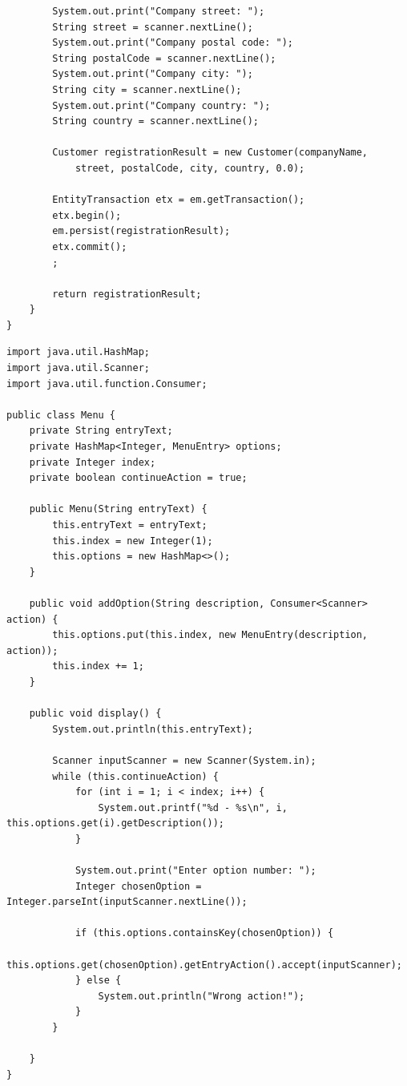 \documentclass[12pt, a4paper]{mwart}
\begin{document}
\begin{lstlisting}
        System.out.print("Company street: ");
        String street = scanner.nextLine();
        System.out.print("Company postal code: ");
        String postalCode = scanner.nextLine();
        System.out.print("Company city: ");
        String city = scanner.nextLine();
        System.out.print("Company country: ");
        String country = scanner.nextLine();

        Customer registrationResult = new Customer(companyName, 
        	street, postalCode, city, country, 0.0);

        EntityTransaction etx = em.getTransaction();
        etx.begin();
        em.persist(registrationResult);
        etx.commit();
        ;

        return registrationResult;
    }
}
\end{lstlisting}

\begin{lstlisting}
import java.util.HashMap;
import java.util.Scanner;
import java.util.function.Consumer;

public class Menu {
    private String entryText;
    private HashMap<Integer, MenuEntry> options;
    private Integer index;
    private boolean continueAction = true;

    public Menu(String entryText) {
        this.entryText = entryText;
        this.index = new Integer(1);
        this.options = new HashMap<>();
    }

    public void addOption(String description, Consumer<Scanner> action) {
        this.options.put(this.index, new MenuEntry(description, action));
        this.index += 1;
    }

    public void display() {
        System.out.println(this.entryText);

        Scanner inputScanner = new Scanner(System.in);
        while (this.continueAction) {
            for (int i = 1; i < index; i++) {
                System.out.printf("%d - %s\n", i, this.options.get(i).getDescription());
            }

            System.out.print("Enter option number: ");
            Integer chosenOption = Integer.parseInt(inputScanner.nextLine());

            if (this.options.containsKey(chosenOption)) {
                this.options.get(chosenOption).getEntryAction().accept(inputScanner);
            } else {
                System.out.println("Wrong action!");
            }
        }

    }
}
\end{lstlisting}
\end{document}
